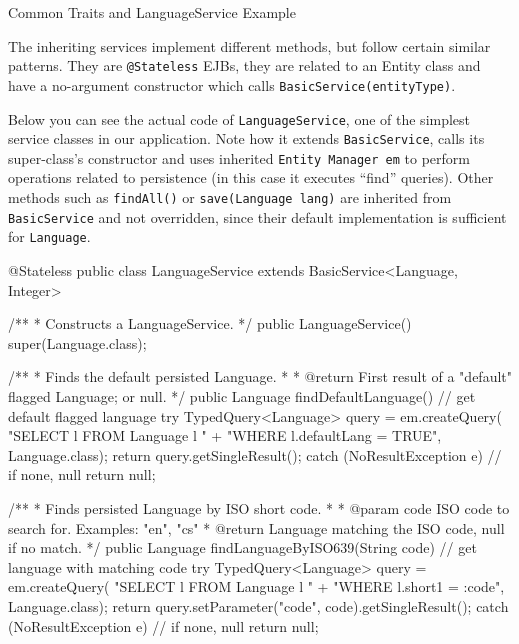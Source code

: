 \enditems

\secc Common Traits and LanguageService Example

The inheriting services implement different methods, but follow certain similar patterns. They are {\tt @Stateless} EJBs, they are related to an Entity class and have a no-argument constructor which calls {\tt BasicService(entityType)}.

Below you can see the actual code of {\tt LanguageService}, one of the simplest service classes in our application. Note how it extends {\tt BasicService}, calls its super-class’s constructor and uses inherited {\tt Entity Manager em} to perform operations related to persistence (in this case it executes “find” queries). Other methods such as {\tt findAll()} or {\tt save(Language lang)} are inherited from {\tt BasicService} and not overridden, since their default implementation is sufficient for {\tt Language}.

\vfil \break

\begtt

@Stateless
public class LanguageService extends BasicService<Language, Integer> {

    /**
     * Constructs a LanguageService.
     */
    public LanguageService() {
        super(Language.class);
    }
    
    /**
     * Finds the default persisted Language.
     *
     * @return First result of a "default" flagged Language; or null.
     */
    public Language findDefaultLanguage() {
        // get default flagged language
        try {
            TypedQuery<Language> query = em.createQuery(
                    "SELECT l FROM Language l "
                            + "WHERE l.defaultLang = TRUE",
                    Language.class);
            return query.getSingleResult();
        } catch (NoResultException e) {
            // if none, null
            return null;
        }
    }
    
    /**
     * Finds persisted Language by ISO short code.
     *
     * @param code ISO code to search for. Examples: "en", "cs"
     * @return Language matching the ISO code, null if no match.
     */
    public Language findLanguageByISO639(String code) {
        // get language with matching code
        try {
            TypedQuery<Language> query = em.createQuery(
                    "SELECT l FROM Language l "
                            + "WHERE l.short1 = :code",
                    Language.class);
            return query.setParameter("code", code).getSingleResult();
        } catch (NoResultException e) {
            // if none, null
            return null;
        }
    }
}
\endtt

